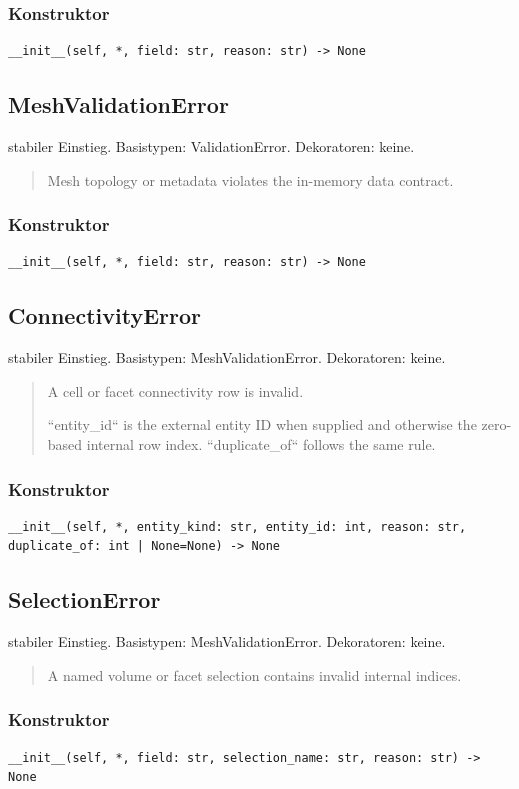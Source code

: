 \subsubsection*{Konstruktor}
\begin{lstlisting}
__init__(self, *, field: str, reason: str) -> None
\end{lstlisting}
\subsection{MeshValidationError}
stabiler Einstieg.
Basistypen: ValidationError. Dekoratoren: keine.
\begin{quote}
Mesh topology or metadata violates the in-memory data contract.
\end{quote}
\subsubsection*{Konstruktor}
\begin{lstlisting}
__init__(self, *, field: str, reason: str) -> None
\end{lstlisting}
\subsection{ConnectivityError}
stabiler Einstieg.
Basistypen: MeshValidationError. Dekoratoren: keine.
\begin{quote}
A cell or facet connectivity row is invalid.\par ``entity\_id`` is the external entity ID when supplied and otherwise the zero-based internal row index. ``duplicate\_of`` follows the same rule.
\end{quote}
\subsubsection*{Konstruktor}
\begin{lstlisting}
__init__(self, *, entity_kind: str, entity_id: int, reason: str, duplicate_of: int | None=None) -> None
\end{lstlisting}
\subsection{SelectionError}
stabiler Einstieg.
Basistypen: MeshValidationError. Dekoratoren: keine.
\begin{quote}
A named volume or facet selection contains invalid internal indices.
\end{quote}
\subsubsection*{Konstruktor}
\begin{lstlisting}
__init__(self, *, field: str, selection_name: str, reason: str) -> None
\end{lstlisting}
